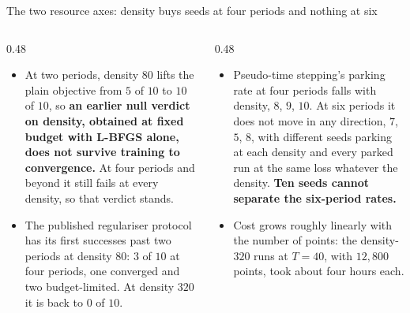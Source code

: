 \documentclass[aspectratio=169,10pt]{beamer}
\newcommand{\hl}[1]{{\color{accent}\textbf{#1}}}
\begin{document}
\begin{frame}[shrink=25]{The two resource axes: density buys seeds at four periods and nothing at six}
  \begin{columns}[T]
    \begin{column}{0.48\textwidth}
      {\small
      \begin{itemize}\small
        \item At two periods, density $80$ lifts the plain objective from $5$ of
              $10$ to $10$ of $10$, so \hl{an earlier null verdict on density,
              obtained at fixed budget with L-BFGS alone, does not survive
              training to convergence.} At four periods and beyond it still
              fails at every density, so that verdict stands.
        \item The published regulariser protocol has its first successes past two
              periods at density $80$: $3$ of $10$ at four periods, one
              converged and two budget-limited. At density $320$ it is back to
              $0$ of $10$.
      \end{itemize}}
    \end{column}
    \begin{column}{0.48\textwidth}
      {\small
      \begin{itemize}\small
        \item Pseudo-time stepping's parking rate at four periods falls with
              density, $8$, $9$, $10$. At six periods it does not move in any
              direction, $7$, $5$, $8$, with different seeds parking at each
              density and every parked run at the same loss whatever the
              density. \hl{Ten seeds cannot separate the six-period rates.}
        \item Cost grows roughly linearly with the number of points: the
              density-$320$ runs at $T = 40$, with $12{,}800$ points, took about
              four hours each.
      \end{itemize}}
    \end{column}
  \end{columns}
\end{frame}
\end{document}
